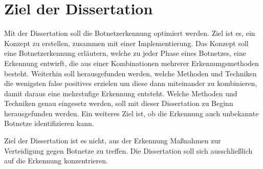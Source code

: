\section{Ziel der Dissertation}
\label{sec:goals}

Mit der Dissertation soll die Botnetzerkennung optimiert werden. Ziel ist es, ein Konzept zu erstellen, zusammen mit einer Implementierung.
Das Konzept soll eine Botnetzerkennung erläutern, welche zu jeder Phase eines Botnetzes, eine Erkennung entwirft, die aus einer Kombinationen mehrerer
Erkennungsmethoden besteht.
Weiterhin soll herausgefunden werden, welche Methoden und Techniken die wenigsten false positives erzielen um diese dann miteinander zu kombinieren, damit
daraus eine mehrstufige Erkennung entsteht. Welche Methoden und Techniken genau eingesetz werden, soll mit dieser Dissertation zu Beginn herausgefunden werden.
Ein weiteres Ziel ist, ob die Erkennung auch unbekannte Botnetze identifizieren kann.

Ziel der Dissertation ist es nicht, aus der Erkennung Maßnahmen zur Verteidigung gegen Botnetze zu treffen. Die Dissertation soll sich ausschließlich auf die 
Erkennung konzentrieren. 
